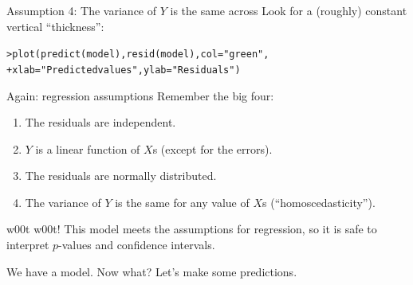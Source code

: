 \documentclass{beamer}\usepackage[]{graphicx}\usepackage[]{color}
\makeatletter
\newcommand{\hlstr}[1]{\textcolor[rgb]{1,0.894,0.71}{#1}}%
\newcommand{\hlstd}[1]{\textcolor[rgb]{1,0.894,0.769}{#1}}%
\newcommand{\hlkwc}[1]{\textcolor[rgb]{0.78,0.941,0.545}{#1}}%
\newcommand{\hlkwd}[1]{\textcolor[rgb]{1,0.78,0.769}{#1}}%
\newenvironment{kframe}{%
 \def\at@end@of@kframe{}%
 \ifinner\ifhmode%
  \def\at@end@of@kframe{\end{minipage}}%
  \begin{minipage}{\columnwidth}%
 \fi\fi%
 \def\FrameCommand##1{\hskip\@totalleftmargin \hskip-\fboxsep
 \colorbox{shadecolor}{##1}\hskip-\fboxsep
     \hskip-\linewidth \hskip-\@totalleftmargin \hskip\columnwidth}%
 \MakeFramed {\advance\hsize-\width
   \@totalleftmargin\z@ \linewidth\hsize
   \@setminipage}}%
 {\par\unskip\endMakeFramed%
 \at@end@of@kframe}
\newenvironment{knitrout}{}{} %
\makeatother
\begin{document}
\begin{darkframes}
    \begin{frame}[fragile]{Assumption 4: The variance of $Y$ is the same across}
      Look for a (roughly) constant vertical ``thickness'':
\begin{knitrout}
\begin{kframe}
\begin{alltt}
\hlstd{> }\hlkwd{plot}\hlstd{(}\hlkwd{predict}\hlstd{(model),} \hlkwd{resid}\hlstd{(model),} \hlkwc{col}\hlstd{=}\hlstr{"green"}\hlstd{,}
\hlstd{+ }  \hlkwc{xlab}\hlstd{=}\hlstr{"Predicted values"}\hlstd{,} \hlkwc{ylab}\hlstd{=}\hlstr{"Residuals"}\hlstd{)}
\end{alltt}
\end{kframe}


\end{knitrout}
    \end{frame}

    \begin{frame}{Again: regression assumptions}
      Remember the big four:
      \begin{enumerate}
        \item The residuals are independent. \greencheckmark
        \item $Y$ is a linear function of $X$s (except for the errors). \greencheckmark
        \item The residuals are normally distributed. \greencheckmark
        \item The variance of $Y$ is the same for any value of $X$s (``homoscedasticity'').  \greencheckmark
      \end{enumerate}
      \pause
      \alert{w00t w00t!} \pause This model meets the assumptions for regression, so it is safe to interpret $p$-values and confidence intervals.
      \lc
    \end{frame}


    \begin{frame}[fragile]{We have a model. Now what?}
      Let's make some predictions.
    \end{frame}



\end{darkframes}
\end{document}
